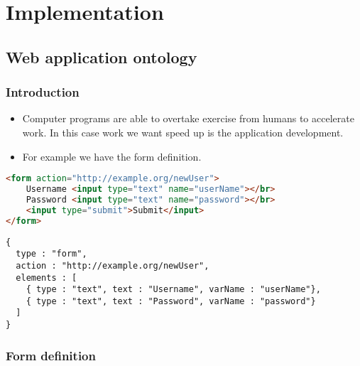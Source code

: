 \chapter{Implementation}


\section{Web application ontology}


\subsection{Introduction}

\begin{itemize}
	\item Computer programs are able to overtake exercise from humans to accelerate work. In this case work we want speed up is the application development. 
\end{itemize}


\begin{itemize}
	\item  For example we have the form definition.
\end{itemize}


\begin{lstlisting}[language=html, basicstyle=\footnotesize]
<form action="http://example.org/newUser">
   	Username <input type="text" name="userName"></br>
	Password <input type="text" name="password"></br>
	<input type="submit">Submit</input>
</form>
\end{lstlisting}


\begin{lstlisting}[basicstyle=\footnotesize]
{
  type : "form",
  action : "http://example.org/newUser",
  elements : [
    { type : "text", text : "Username", varName : "userName"},
    { type : "text", text : "Password", varName : "password"}
  ]
}
\end{lstlisting}





\subsection{Form definition}

